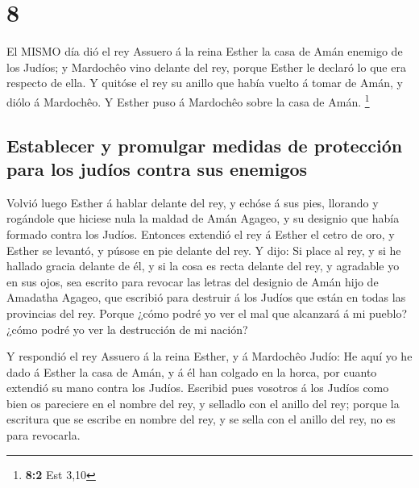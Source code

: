 \hypertarget{section-7}{%
\section{8}\label{section-7}}

 El MISMO día dió el rey Assuero á la reina Esther la casa
de Amán enemigo de los Judíos; y Mardochêo vino delante del rey, porque
Esther le declaró lo que era respecto de ella.  Y quitóse el
rey su anillo que había vuelto á tomar de Amán, y diólo á Mardochêo. Y
Esther puso á Mardochêo sobre la casa de Amán. \footnote{\textbf{8:2}
  Est 3,10}

\hypertarget{establecer-y-promulgar-medidas-de-protecciuxf3n-para-los-juduxedos-contra-sus-enemigos}{%
\subsection{Establecer y promulgar medidas de protección para los judíos
contra sus
enemigos}\label{establecer-y-promulgar-medidas-de-protecciuxf3n-para-los-juduxedos-contra-sus-enemigos}}

 Volvió luego Esther á hablar delante del rey, y echóse á
sus pies, llorando y rogándole que hiciese nula la maldad de Amán
Agageo, y su designio que había formado contra los Judíos. 
Entonces extendió el rey á Esther el cetro de oro, y Esther se levantó,
y púsose en pie delante del rey.  Y dijo: Si place al rey, y
si he hallado gracia delante de él, y si la cosa es recta delante del
rey, y agradable yo en sus ojos, sea escrito para revocar las letras del
designio de Amán hijo de Amadatha Agageo, que escribió para destruir á
los Judíos que están en todas las provincias del rey. 
Porque ¿cómo podré yo ver el mal que alcanzará á mi pueblo? ¿cómo podré
yo ver la destrucción de mi nación?

 Y respondió el rey Assuero á la reina Esther, y á Mardochêo
Judío: He aquí yo he dado á Esther la casa de Amán, y á él han colgado
en la horca, por cuanto extendió su mano contra los Judíos. 
Escribid pues vosotros á los Judíos como bien os pareciere en el nombre
del rey, y selladlo con el anillo del rey; porque la escritura que se
escribe en nombre del rey, y se sella con el anillo del rey, no es para
revocarla.

